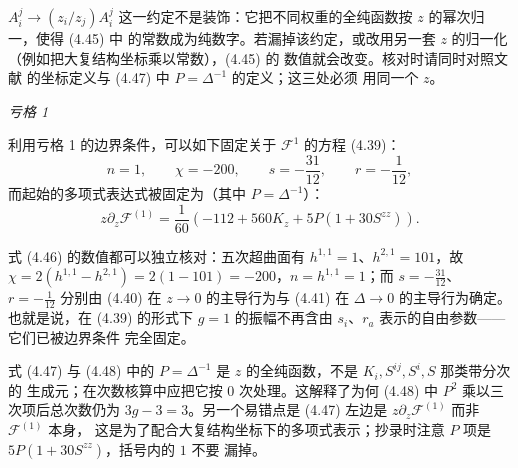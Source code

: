 \begin{yizhu}[易错点]
$A^j_i\to(z_i/z_j)A^j_i$ 这一约定不是装饰：它把不同权重的全纯函数按 $z$ 的幂次归一，使得 (4.45) 中
的常数成为纯数字。若漏掉该约定，或改用另一套 $z$ 的归一化（例如把大复结构坐标乘以常数），(4.45) 的
数值就会改变。核对时请同时对照文献 \cite{ref25} 的坐标定义与 (4.47) 中 $P=\Delta^{-1}$ 的定义；这三处必须
用同一个 $z$。
\end{yizhu}

\medskip
\noindent\emph{亏格 1}\par

利用亏格 1 的边界条件，可以如下固定关于 $\mathcal{F}^1$ 的方程 (4.39)：
\begin{equation}\tag{4.46}
n = 1, \qquad \chi = -200, \qquad s = -\frac{31}{12}, \qquad r = -\frac{1}{12},
\end{equation}
而起始的多项式表达式被固定为（其中 $P=\Delta^{-1}$）：
\begin{equation}\tag{4.47}
z\partial_z\mathcal{F}^{(1)}
= \frac{1}{60}\left(-112 + 560K_z + 5P(1+30S^{zz})\right).
\end{equation}

\begin{yizhu}[物理图像]
式 (4.46) 的数值都可以独立核对：五次超曲面有 $h^{1,1}=1$、$h^{2,1}=101$，故
$\chi = 2(h^{1,1}-h^{2,1}) = 2(1-101) = -200$，$n=h^{1,1}=1$；而 $s=-\frac{31}{12}$、
$r=-\frac{1}{12}$ 分别由 (4.40) 在 $z\to0$ 的主导行为与 (4.41) 在 $\Delta\to0$ 的主导行为确定。
也就是说，在 (4.39) 的形式下 $g=1$ 的振幅不再含由 $s_i$、$r_a$ 表示的自由参数——它们已被边界条件
完全固定。
\end{yizhu}

\begin{yizhu}[易错点]
式 (4.47) 与 (4.48) 中的 $P=\Delta^{-1}$ 是 $z$ 的全纯函数，不是 $K_i,S^{ij},S^i,S$ 那类带分次的
生成元；在次数核算中应把它按 $0$ 次处理。这解释了为何 (4.48) 中 $P^2$ 乘以三次项后总次数仍为
$3g-3=3$。另一个易错点是 (4.47) 左边是 $z\partial_z\mathcal{F}^{(1)}$ 而非 $\mathcal{F}^{(1)}$ 本身，
这是为了配合大复结构坐标下的多项式表示；抄录时注意 $P$ 项是 $5P(1+30S^{zz})$，括号内的 $1$ 不要
漏掉。
\end{yizhu}

